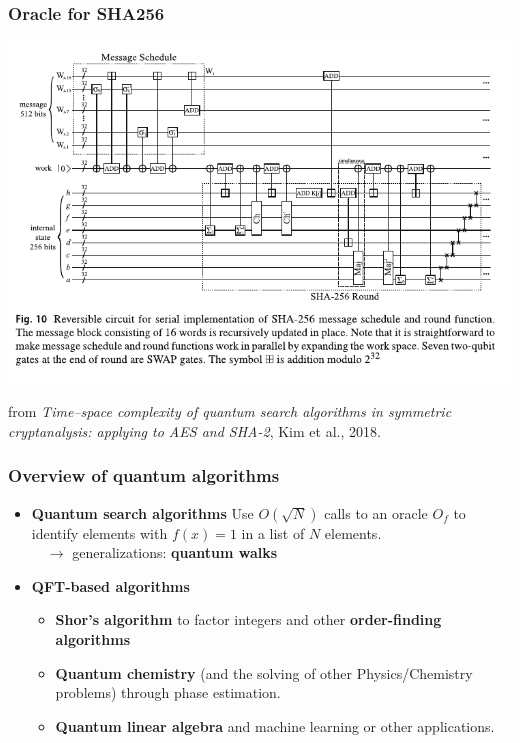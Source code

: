 \documentclass{beamer}
\begin{document}
\begin{frame}
\frametitle{Oracle for SHA256}

\begin{center}
\includegraphics[width=.9\textwidth]{sha256.pdf}
\end{center}
{
from \emph{Time–space complexity of quantum search algorithms in symmetric cryptanalysis: applying to AES and SHA-2}, Kim et al., 2018.
}

\end{frame}

\begin{frame}
\frametitle{Overview of quantum algorithms}

\begin{itemize}
\item \textbf{Quantum search algorithms} Use $O(\sqrt{N})$ calls to an oracle $O_f$ to identify
elements with $f(x)=1$ in a list of $N$ elements.\\
 $\quad\rightarrow$ generalizations: \textbf{quantum walks}
\item \textbf{QFT-based algorithms}
\begin{itemize}
\item \textbf{Shor's algorithm } to factor integers and other \textbf{order-finding algorithms}
\item \textbf{Quantum chemistry} (and the solving of other Physics/Chemistry problems) through phase estimation.
\item \textbf{Quantum linear algebra} and machine learning or other applications.
\end{itemize}                    
\end{itemize}

\end{frame}
\end{document}
